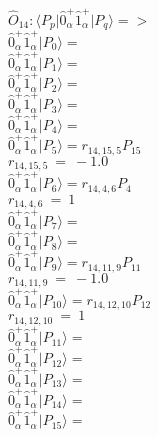 \documentclass[14pt]{article}
\begin{document}
    $\hat{O}_{14}:  \langle{P_p}\vert \hat{0}_{\alpha}^{+}\hat{1}_{\alpha}^{+} \vert{P_q}\rangle => $ \\ 
    $ \hat{0}_{\alpha}^{+}\hat{1}_{\alpha}^{+} \vert{P_{0}}\rangle =  $ \\ 
    $ \hat{0}_{\alpha}^{+}\hat{1}_{\alpha}^{+} \vert{P_{1}}\rangle =  $ \\ 
    $ \hat{0}_{\alpha}^{+}\hat{1}_{\alpha}^{+} \vert{P_{2}}\rangle =  $ \\ 
    $ \hat{0}_{\alpha}^{+}\hat{1}_{\alpha}^{+} \vert{P_{3}}\rangle =  $ \\ 
    $ \hat{0}_{\alpha}^{+}\hat{1}_{\alpha}^{+} \vert{P_{4}}\rangle =  $ \\ 
    $ \hat{0}_{\alpha}^{+}\hat{1}_{\alpha}^{+} \vert{P_{5}}\rangle = {r}_{14,15,5}P_{15} $ \\ 
    ${r}_{14,15,5}\ =\ -1.0 $ \\ 
    $ \hat{0}_{\alpha}^{+}\hat{1}_{\alpha}^{+} \vert{P_{6}}\rangle = {r}_{14,4,6}P_{4} $ \\ 
    ${r}_{14,4,6}\ =\ 1 $ \\ 
    $ \hat{0}_{\alpha}^{+}\hat{1}_{\alpha}^{+} \vert{P_{7}}\rangle =  $ \\ 
    $ \hat{0}_{\alpha}^{+}\hat{1}_{\alpha}^{+} \vert{P_{8}}\rangle =  $ \\ 
    $ \hat{0}_{\alpha}^{+}\hat{1}_{\alpha}^{+} \vert{P_{9}}\rangle = {r}_{14,11,9}P_{11} $ \\ 
    ${r}_{14,11,9}\ =\ -1.0 $ \\ 
    $ \hat{0}_{\alpha}^{+}\hat{1}_{\alpha}^{+} \vert{P_{10}}\rangle = {r}_{14,12,10}P_{12} $ \\ 
    ${r}_{14,12,10}\ =\ 1 $ \\ 
    $ \hat{0}_{\alpha}^{+}\hat{1}_{\alpha}^{+} \vert{P_{11}}\rangle =  $ \\ 
    $ \hat{0}_{\alpha}^{+}\hat{1}_{\alpha}^{+} \vert{P_{12}}\rangle =  $ \\ 
    $ \hat{0}_{\alpha}^{+}\hat{1}_{\alpha}^{+} \vert{P_{13}}\rangle =  $ \\ 
    $ \hat{0}_{\alpha}^{+}\hat{1}_{\alpha}^{+} \vert{P_{14}}\rangle =  $ \\ 
    $ \hat{0}_{\alpha}^{+}\hat{1}_{\alpha}^{+} \vert{P_{15}}\rangle =  $ \\ 
    
\end{document}
